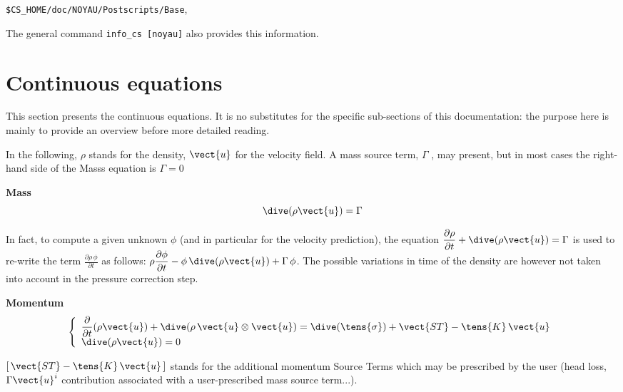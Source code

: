 \begin{center}
\texttt{\$CS\_HOME/doc/NOYAU/Postscripts/Base},
\end{center}

The general command \texttt{info\_cs [noyau]} also provides this
information.

\newpage %

\section*{Continuous equations}


This section presents the continuous equations. It is no substitutes for the
specific sub-sections of this documentation: the purpose here is mainly to
provide an overview before more detailed reading.

In the following, $\rho $ stands for the density, $\vect{u}$ for the
velocity field. A mass source term, $\Gamma $ , may present, but in most
cases the right-hand side of the Masss equation is $\Gamma =0$

\textbf{Mass}\newline
\begin{equation}
\dive(\rho \vect{u})=\Gamma
\end{equation}

In fact, to compute a given unknown $\phi$ (and in particular for the
velocity prediction), the equation $\displaystyle \frac{\partial \rho}{%
\partial t} + \dive(\rho \vect{u}) = \Gamma$ is used to re-write the term $%
\displaystyle \frac{\partial \rho\,\phi}{\partial t}$ as follows:
\mbox{$\displaystyle \rho\frac{\partial  \phi}{\partial t} - \phi\,\dive(\rho \vect{u})
+ \Gamma\,\phi$}. The possible variations in time of the density are however
not taken into account in the pressure correction step.

\clearpage \textbf{Momentum}
\begin{equation}
\left\{
\begin{array}{l}
\displaystyle\frac{\partial }{\partial t}(\rho \vect{u})+\dive(\rho \,%
\vect{u}\otimes \vect{u})=\dive(\tens{\sigma})+\vect{ST}-\tens{K}\,\vect{u}
\\
\dive(\rho \vect{u})=0%
\end{array}%
\right.
\end{equation}

$[\,\vect{ST}-\tens{K}\,\vect{u}\,]$ stands for the additional momentum
Source Terms which may be prescribed by the user (head loss, $\Gamma \vect{u}%
^{i}$ contribution associated with a user-prescribed mass source term...).

